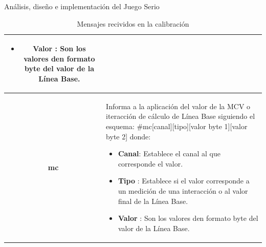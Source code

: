 \begin{thesischapter}{2} {Análisis, diseño e implementación del Juego Serio}
\begin{table}[ht]
\begin{tabular}{ |c|p{14cm}|}
\begin{minipage}{14cm}
\begin{itemize}
                                        \item \textbf{Valor} : Son los valores den formato byte del valor de la Línea Base.  
                                    \end{itemize}
                                    \vspace{1pt}
                                \end{minipage}\\\hline 
            \textbf{mc}     &   \begin{minipage}{14cm}
                                    \vspace{1pt}
                                    Informa a la aplicación del valor de la MCV o iteracción de cálculo de Línea Base siguiendo el esquema: \#mc[canal][tipo][valor byte 1][valor byte 2] donde:
                                    \begin{itemize}
                                        \item \textbf{Canal}: Establece el canal al que corresponde el valor.
                                        \item \textbf{Tipo} : Establece si el valor corresponde a un medición de una interacción o al valor final de la Línea Base.
                                        \item \textbf{Valor} : Son los valores den formato byte del valor de la Línea Base.  
                                    \end{itemize}
                                    \vspace{1pt}
                                \end{minipage} \\\hline                        
        \end{tabular}
        \caption{Mensajes recividos en la calibración}
        \label{table:recive-msg-in-calibration}
    \end{table} 



\end{thesischapter}
